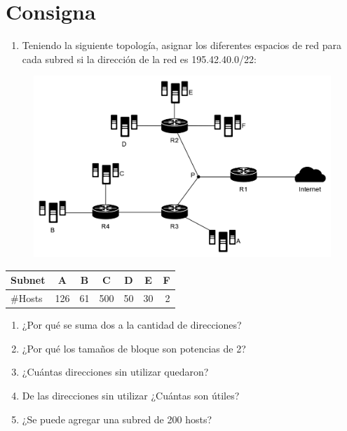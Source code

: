 \section*{Consigna}

\begin{enumerate}[left=0cm]
    \item Teniendo la siguiente topología, asignar los diferentes espacios de red para cada subred si la dirección de la red es 195.42.40.0/22:
\end{enumerate}

\vspace{-\baselineskip}
\begin{figure}[H]
    \centering
    \includegraphics[width=1\linewidth]{Images/topologia.png}
\end{figure}

\vspace{-\baselineskip}
\begin{table}[H]
    \centering
    \begin{tabular}{|l|c|c|c|c|c|c|}
    \hline
    \multicolumn{1}{|c|}{Subnet} & A & B & C & D & E & F \\ \hline
    \#Hosts & \multicolumn{1}{r|}{126} & \multicolumn{1}{r|}{61} & \multicolumn{1}{r|}{500} & \multicolumn{1}{r|}{50} & \multicolumn{1}{r|}{30} & \multicolumn{1}{r|}{2} \\ \hline
    \end{tabular}
\end{table}

\begin{enumerate}[start=2, left=0cm]
    \item ¿Por qué se suma dos a la cantidad de direcciones?
    \item ¿Por qué los tamaños de bloque son potencias de 2?
    \item ¿Cuántas direcciones sin utilizar quedaron?
    \item De las direcciones sin utilizar ¿Cuántas son útiles?
    \item ¿Se puede agregar una subred de 200 hosts?
\end{enumerate}